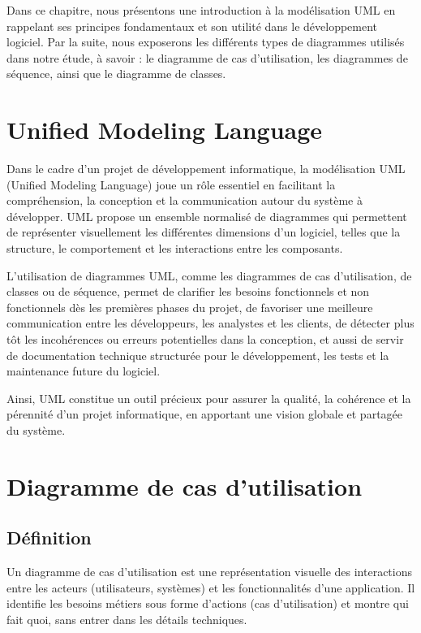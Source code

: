 \documentclass[12pt,a4paper]{report}
\begin{document}
	Dans ce chapitre, nous présentons une introduction à la modélisation UML en rappelant ses principes fondamentaux et son utilité dans le développement logiciel. Par la suite, nous exposerons les différents types de diagrammes utilisés dans notre étude, à savoir : le diagramme de cas d’utilisation, les diagrammes de séquence, ainsi que le diagramme de classes.
	
	\section{Unified Modeling Language}
	
	Dans le cadre d’un projet de développement informatique, la modélisation UML (Unified Modeling Language) joue un rôle essentiel en facilitant la compréhension, la conception et la communication autour du système à développer. UML propose un ensemble normalisé de diagrammes qui permettent de représenter visuellement les différentes dimensions d’un logiciel, telles que la structure, le comportement et les interactions entre les composants.
	
	L’utilisation de diagrammes UML, comme les diagrammes de cas d’utilisation, de classes ou de séquence, permet de clarifier les besoins fonctionnels et non fonctionnels dès les premières phases du projet, de favoriser une meilleure communication entre les développeurs, les analystes et les clients, de détecter plus tôt les incohérences ou erreurs potentielles dans la conception, et aussi de servir de documentation technique structurée pour le développement, les tests et la maintenance future du logiciel.
	
	Ainsi, UML constitue un outil précieux pour assurer la qualité, la cohérence et la pérennité d’un projet informatique, en apportant une vision globale et partagée du système.
	
	\section{Diagramme de cas d'utilisation}
	
	\subsection{Définition}
	
	Un diagramme de cas d'utilisation est une représentation visuelle des interactions entre les acteurs (utilisateurs, systèmes) et les fonctionnalités d'une application. Il identifie les besoins métiers sous forme d'actions (cas d’utilisation) et montre qui fait quoi, sans entrer dans les détails techniques.
	
\end{document}
